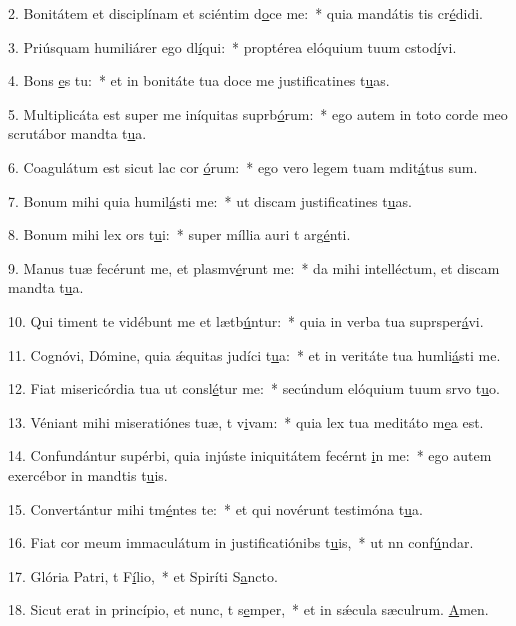 2. Bonitátem et disciplínam et sciéntim d\uline{o}ce me:~* quia mandátis tis cr\uline{é}didi.\par 
3. Priúsquam humiliárer ego dl\uline{í}qui:~* proptérea elóquium tuum cstod\uline{í}vi.\par 
4. Bons \uline{e}s tu:~* et in bonitáte tua doce me justificatines t\uline{u}as.\par 
5. Multiplicáta est super me iníquitas suprb\uline{ó}rum:~* ego autem in toto corde meo scrutábor mandta t\uline{u}a.\par 
6. Coagulátum est sicut lac cor \uline{ó}rum:~* ego vero legem tuam mdit\uline{á}tus sum.\par 
7. Bonum mihi quia humil\uline{á}sti me:~* ut discam justificatines t\uline{u}as.\par 
8. Bonum mihi lex ors t\uline{u}i:~* super míllia auri t arg\uline{é}nti.\par 
9. Manus tuæ fecérunt me, et plasmv\uline{é}runt me:~* da mihi intelléctum, et discam mandta t\uline{u}a.\par 
10. Qui timent te vidébunt me et lætb\uline{ú}ntur:~* quia in verba tua suprsper\uline{á}vi.\par 
11. Cognóvi, Dómine, quia ǽquitas judíci t\uline{u}a:~* et in veritáte tua humli\uline{á}sti me.\par 
12. Fiat misericórdia tua ut consl\uline{é}tur me:~* secúndum elóquium tuum srvo t\uline{u}o.\par 
13. Véniant mihi miseratiónes tuæ, t v\uline{i}vam:~* quia lex tua meditáto m\uline{e}a est.\par 
14. Confundántur supérbi, quia injúste iniquitátem fecérnt \uline{i}n me:~* ego autem exercébor in mandtis t\uline{u}is.\par 
15. Convertántur mihi tm\uline{é}ntes te:~* et qui novérunt testimóna t\uline{u}a.\par 
16. Fiat cor meum immaculátum in justificatiónibs t\uline{u}is,~* ut nn conf\uline{ú}ndar.\par 
17. Glória Patri, t F\uline{í}lio,~* et Spiríti S\uline{a}ncto.\par 
18. Sicut erat in princípio, et nunc, t s\uline{e}mper,~* et in sǽcula sæculrum. \uline{A}men.\par 
